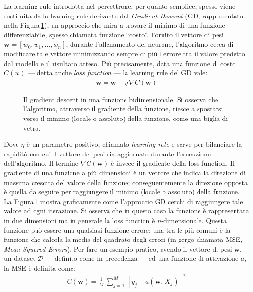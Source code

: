 La learning rule introdotta nel percettrone, per quanto semplice, spesso viene sostituita dalla learning rule derivante dal \textit{Gradient Descent} (\acs{GD}, rappresentato nella Figura\,\ref{fig:gradient-descent}), un approccio che mira a trovare il minimo di una funzione differenziabile, spesso chiamata funzione ``costo''. Fornito il vettore di pesi $\mathbf{w} = \left[w_0, w_1, \dots, w_n \right]$, durante l'allenamento del neurone, l'algoritmo cerca di modificare tale vettore minimizzando sempre di più l'errore tra il valore predetto dal modello e il risultato atteso. Più precisamente, data una funzione di costo $C(w)$ — detta anche \textit{loss function} — la learning rule del \acs{GD} vale:
% 
\begin{gather*}
    \mathbf{w} = \mathbf{w} - \eta\,\nabla C\left(\mathbf{w}\right)
\end{gather*}
% 
\begin{figure}[!b]
    \centering
    
    \caption[Il gradient descent in una funzione bidimensionale.]{Il gradient descent in una funzione bidimensionale. Si osserva che l'algoritmo, attraverso il gradiente della funzione, riesce a spostarsi verso il minimo (locale o assoluto) della funzione, come una biglia di vetro.}\label{fig:gradient-descent}
\end{figure}
% 
\noindent Dove $\eta$ è un parametro positivo, chiamato \textit{learning rate} e serve per bilanciare la rapidità con cui il vettore dei pesi sia aggiornato durante l'esecuzione dell'algoritmo. Il termine $\nabla C\left(\mathbf{w}\right)$ è invece il gradiente della loss function. Il gradiente di una funzione a più dimensioni è un vettore che indica la direzione di massima crescita del valore della funzione; conseguentemente la direzione opposta è quella da seguire per raggiungere il minimo (locale o assoluto) della funzione. La Figura\,\ref{fig:gradient-descent} mostra graficamente come l'approccio \acs{GD} cerchi di raggiungere tale valore ad ogni iterazione. Si osserva che in questo caso la funzione è rappresentata in due dimensioni ma in generale la loss function è $n$-dimensionale. Questa funzione può essere una qualsiasi funzione errore: una tra le più comuni è la funzione che calcola la media del quadrato degli errori (in gergo chiamata \acs{MSE}, \textit{Mean Squared Errors}). Per fare un esempio pratico, avendo il vettore di pesi $\mathbf{w}$, un dataset $\mathcal{D}$ — definito come in precedenza — ed una funzione di attivazione $a$, la \acs{MSE} è definita come:
% 
\begin{gather*}
    C(\mathbf{w}) = \frac{1}{M}\,\sum_{j = 1}^M\,{\left[ y_j - a(\mathbf{w},\,X_j) \right]}^2
\end{gather*}
